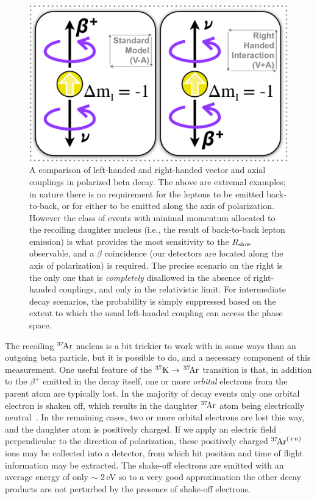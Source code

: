 \begin{figure}[h!t!b!]
	\centering
	\includegraphics[width=.999\linewidth]{Figures/RHC.png}
	\caption[A Comparison of Left-Handed and Right-Handed Couplings]{A comparison of left-handed and right-handed vector and axial couplings in polarized beta decay.  The above are extremal examples;  in nature there is no requirement for the leptons to be emitted back-to-back, or for either to be emitted along the axis of polarization.  However the class of events with minimal momentum allocated to the recoiling daughter nucleus (i.e., the result of back-to-back lepton emission) is what provides the most sensitivity to the $R_{\textrm{slow}}$ observable, and a $\beta$ coincidence (our detectors are located along the axis of polarization) is required.
	The precise scenario on the right is the only one that is \emph{completely} disallowed in the absence of right-handed couplings, and only in the relativistic limit.  For intermediate decay scenarios, the probability is simply suppressed based on the extent to which the usual left-handed coupling can access the phase space.
	\label{fig:rhc}
	}
\end{figure}

The recoiling $^{37}\textrm{\!Ar}$ nucleus is a bit trickier to work with in some ways than an outgoing beta particle, but it is possible to do, and a necessary component of this measurement.  One useful feature of the $^{37}\textrm{K} \rightarrow \,^{37}\textrm{\!Ar}$ transition is that, in addition to the $\beta^+$ emitted in the decay itself, one or more \emph{orbital} electrons from the parent atom are typically lost.  In the majority of decay events only one orbital electron is shaken off, which results in the daughter $^{37}\textrm{\!Ar}$ atom being electrically neutral~\cite{gorelov2000}\cite{dan_thesis}.  In the remaining cases, two or more orbital electrons are lost this way, and the daughter atom is positively charged.  If we apply an electric field perpendicular to the direction of polarization, these positively charged $^{37}\textrm{\!Ar}^{(+n)}$ ions may be collected into a detector, from which hit position and time of flight information may be extracted.  The shake-off electrons are emitted with an average energy of only $\sim$ 2\,eV so to a very good approximation the other decay products are not perturbed by the presence of shake-off electrons\cite{Levinger}.  


